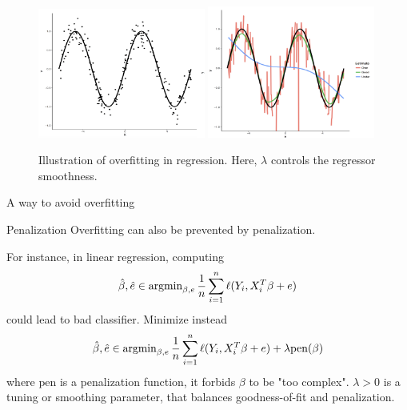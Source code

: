 \documentclass[xcolor={usenames,dvipsnames},handout]{beamer}
\begin{document}
\begin{frame}
\begin{figure}
\begin{center}
\includegraphics[width=0.49\textwidth]{overfitting_reg1.png}
\includegraphics[width=0.49\textwidth]{overfitting_reg2.png}
\caption{Illustration of overfitting in regression. Here, $\lambda$ controls the regressor smoothness.}
\end{center}
\end{figure}
\end{frame}


 
\begin{frame}{A way to avoid overfitting}
\begin{block}{Penalization}
 Overfitting can also be prevented by penalization.
 \end{block}
  For instance, in linear regression, computing
  $$
  \hat{\beta}, \hat{e} \in \operatorname{argmin}_{\beta, e} \frac{1}{n} \sum_{i=1}^n \ell( Y_i, X_i^T \beta + e)
  $$
  could lead to bad classifier. Minimize instead 
    $$
  \hat{\beta}, \hat{e} \in \operatorname{argmin}_{\beta, e} \frac{1}{n} \sum_{i=1}^n \ell( Y_i, X_i^T \beta + e) + \lambda \mathrm{pen}(\beta)
  $$
  where $\mathrm{pen}$ is a penalization function, it forbids $\beta$ to be "too complex". $\lambda > 0$ is a tuning or smoothing parameter, that balances goodness-of-fit and penalization.
  \end{frame}
\end{document}
